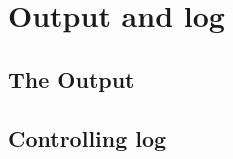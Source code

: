 \hypertarget{chap:output}{}
\chapter{Output and log}
\label{sec:output}
\chapterauthor{}



\section{The Output}


\section{Controlling log}





